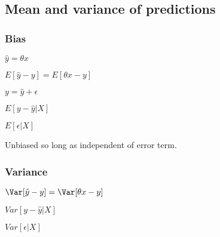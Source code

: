 
\subsection{Mean and variance of predictions}

\subsubsection{Bias}

\(\hat y =\theta x\)

\(E[\hat y-y]=E[\theta x-y]\) 

\(y=\hat y + \epsilon \)

\(E[y-\hat y |X]\)

\(E[\epsilon |X]\)

Unbiased so long as independent of error term.

\subsubsection{Variance}

\(\Var [\hat y-y]=\Var [\theta x-y]\)

\(Var[y-\hat y |X]\)

\(Var[\epsilon |X]\)

